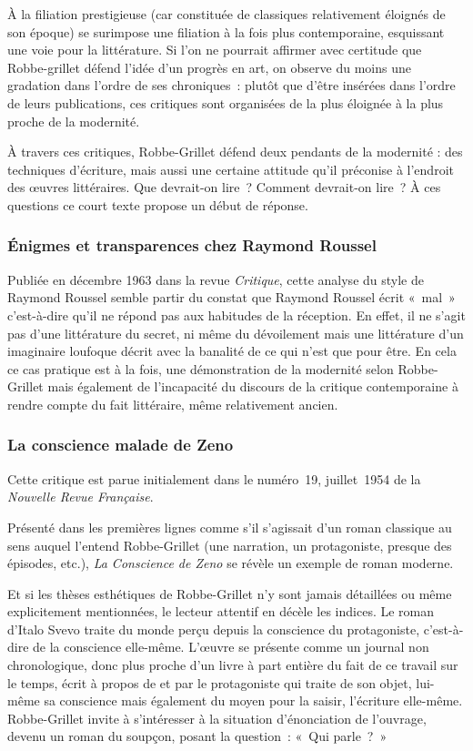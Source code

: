 À la filiation prestigieuse (car constituée de classiques relativement éloignés de son époque) se surimpose une filiation à la fois plus contemporaine, esquissant une voie pour la littérature. Si l'on ne pourrait affirmer avec certitude que Robbe-grillet défend l'idée d'un progrès en art, on observe du moins une gradation dans l'ordre de ses chroniques~: plutôt que d'être insérées dans l'ordre de leurs publications, ces critiques sont organisées de la plus éloignée à la plus proche de la modernité.

À travers ces critiques, Robbe-Grillet défend deux pendants de la modernité : des techniques d'écriture, mais aussi une certaine attitude qu'il préconise à l'endroit des œuvres littéraires. Que devrait-on lire~? Comment devrait-on lire~? À ces questions ce court texte propose un début de réponse.


\subsubsection{Énigmes et transparences chez Raymond Roussel}
Publiée en décembre 1963 dans la revue \textit{Critique}, cette analyse du style de Raymond Roussel semble partir du constat que Raymond Roussel écrit «~mal~» c'est-à-dire qu'il ne répond pas aux habitudes de la réception. En effet, il ne s'agit pas d'une littérature du secret, ni même du dévoilement mais une littérature d'un imaginaire loufoque décrit avec la banalité de ce qui n'est que pour être. En cela ce cas pratique est à la fois, une démonstration de la modernité selon Robbe-Grillet mais également de l'incapacité du discours de la critique contemporaine à rendre compte du fait littéraire, même relativement ancien.

\subsubsection{La conscience malade de Zeno}
Cette critique est parue initialement dans le numéro~19, juillet~1954 de la \textit{Nouvelle Revue Française}.

Présenté dans les premières lignes comme s'il s'agissait d'un roman classique au sens auquel l'entend Robbe-Grillet (une narration, un protagoniste, presque des épisodes, etc.), \textit{La Conscience de Zeno} se révèle un exemple de roman moderne.

Et si les thèses esthétiques de Robbe-Grillet n'y sont jamais détaillées ou même explicitement mentionnées, le lecteur attentif en décèle les indices. Le roman d'Italo Svevo traite du monde perçu depuis la conscience du protagoniste, c'est-à-dire de la conscience elle-même. L'œuvre se présente comme un journal non chronologique, donc plus proche d'un livre à part entière du fait de ce travail sur le temps, écrit à propos de et par le protagoniste qui traite de son objet, lui-même sa conscience mais également du moyen pour la saisir, l'écriture elle-même. Robbe-Grillet invite à s'intéresser à la situation d'énonciation de l'ouvrage, devenu un roman du soupçon, posant la question~: «~Qui parle~?~»


